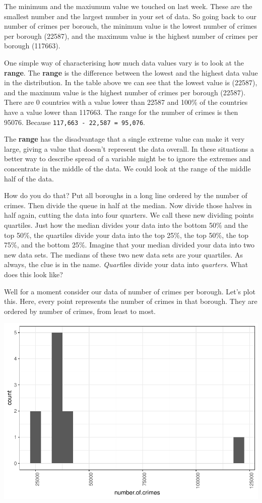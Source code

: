 \documentclass[
]{book}
\begin{document}
The minimum and the maxiumum value we touched on last week. These are the smallest number and the largest number in your set of data. So going back to our number of crimes per borouch, the minimum value is the lowest number of crimes per borough (22587), and the maximum value is the highest number of crimes per borough (117663).

One simple way of characterising how much data values vary is to look at the \textbf{range}. The \textbf{range} is the difference between the lowest and the highest data value in the distribution. In the table above we can see that the lowest value is (22587), and the maximum value is the highest number of crimes per borough (22587). There are 0 countries with a value lower than 22587 and 100\% of the countries have a value lower than 117663. The range for the number of crimes is then 95076. Because \texttt{117,663\ -\ 22,587\ =\ 95,076}.

The \textbf{range} has the disadvantage that a single extreme value can make it very large, giving a value that doesn't represent the data overall. In these situations a better way to describe spread of a variable might be to ignore the extremes and concentrate in the middle of the data. We could look at the range of the middle half of the data.

How do you do that? Put all boroughs in a long line ordered by the number of crimes. Then divide the queue in half at the median. Now divide those halves in half again, cutting the data into four quarters. We call these new dividing points quartiles. Just how the median divides your data into the bottom 50\% and the top 50\%, the quartiles divide your data into the top 25\%, the top 50\%, the top 75\%, and the bottom 25\%. Imagine that your median divided your data into two new data sets. The medians of these two new data sets are your quartiles. As always, the clue is in the name. \emph{Quart}iles divide your data into \emph{quarters}. What does this look like?

Well for a moment consider our data of number of crimes per borough. Let's plot this. Here, every point represents the number of crimes in that borough. They are ordered by number of crimes, from least to most.

\includegraphics{bookdown-demo_files/figure-latex/unnamed-chunk-23-1.pdf}
\end{document}
